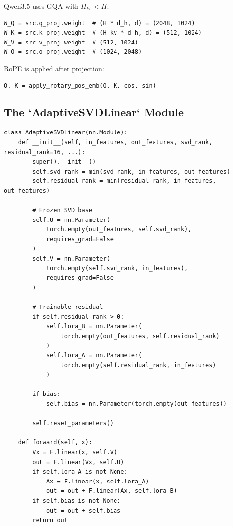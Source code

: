 Qwen3.5 uses GQA with $H_{kv} < H$:

\begin{lstlisting}
W_Q = src.q_proj.weight  # (H * d_h, d) = (2048, 1024)
W_K = src.k_proj.weight  # (H_kv * d_h, d) = (512, 1024)
W_V = src.v_proj.weight  # (512, 1024)
W_O = src.o_proj.weight  # (1024, 2048)
\end{lstlisting}

RoPE is applied after projection:

\begin{lstlisting}
Q, K = apply_rotary_pos_emb(Q, K, cos, sin)
\end{lstlisting}

\subsection{The `AdaptiveSVDLinear` Module}

\begin{lstlisting}
class AdaptiveSVDLinear(nn.Module):
    def __init__(self, in_features, out_features, svd_rank, residual_rank=16, ...):
        super().__init__()
        self.svd_rank = min(svd_rank, in_features, out_features)
        self.residual_rank = min(residual_rank, in_features, out_features)
        
        # Frozen SVD base
        self.U = nn.Parameter(
            torch.empty(out_features, self.svd_rank),
            requires_grad=False
        )
        self.V = nn.Parameter(
            torch.empty(self.svd_rank, in_features),
            requires_grad=False
        )
        
        # Trainable residual
        if self.residual_rank > 0:
            self.lora_B = nn.Parameter(
                torch.empty(out_features, self.residual_rank)
            )
            self.lora_A = nn.Parameter(
                torch.empty(self.residual_rank, in_features)
            )
        
        if bias:
            self.bias = nn.Parameter(torch.empty(out_features))
        
        self.reset_parameters()
    
    def forward(self, x):
        Vx = F.linear(x, self.V)
        out = F.linear(Vx, self.U)
        if self.lora_A is not None:
            Ax = F.linear(x, self.lora_A)
            out = out + F.linear(Ax, self.lora_B)
        if self.bias is not None:
            out = out + self.bias
        return out
\end{lstlisting}

